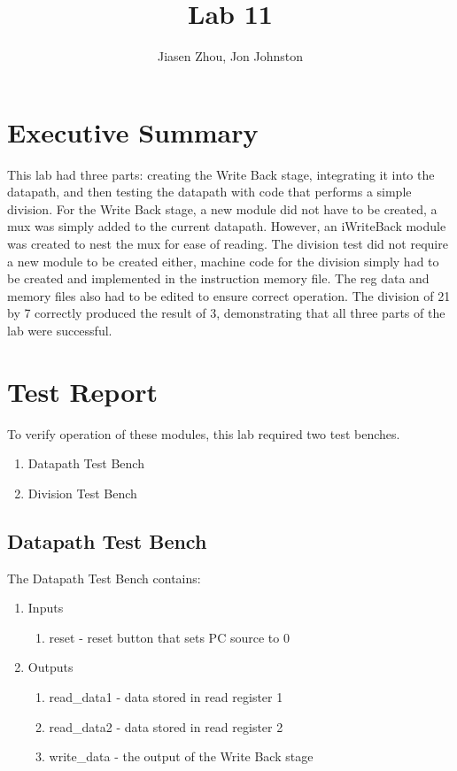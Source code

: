 \documentclass{article}
\author{Jiasen Zhou, Jon Johnston}
\title{Lab 11}
\begin{document}
\maketitle

\section{Executive Summary}
This lab had three parts: creating the Write Back stage, integrating it into the datapath, and then testing the datapath with code that performs a simple division. For the Write Back stage, a new module did not have to be created, a mux was simply added to the current datapath. However, an iWriteBack module was created to nest the mux for ease of reading. The division test did not require a new module to be created either, machine code for the division simply had to be created and implemented in the instruction memory file. The reg data and memory files also had to be edited to ensure correct operation. The division of 21 by 7 correctly produced the result of 3, demonstrating that all three parts of the lab were successful.

\section{Test Report}
To verify operation of these modules, this lab required two test benches. 
\begin{enumerate}
	\item Datapath Test Bench
	\item Division Test Bench
\end{enumerate}

\subsection{Datapath Test Bench}
The Datapath Test Bench contains:
\begin{enumerate}
	\item Inputs
	\begin{enumerate}
		\item reset - reset button that sets PC source to 0
	\end{enumerate}	
	\item Outputs
	\begin{enumerate}	
		\item read\_data1 - data stored in read register 1
		\item read\_data2 - data stored in read register 2
		\item write\_data - the output of the Write Back stage 
	\end{enumerate}
\end{enumerate} 
\end{document}
